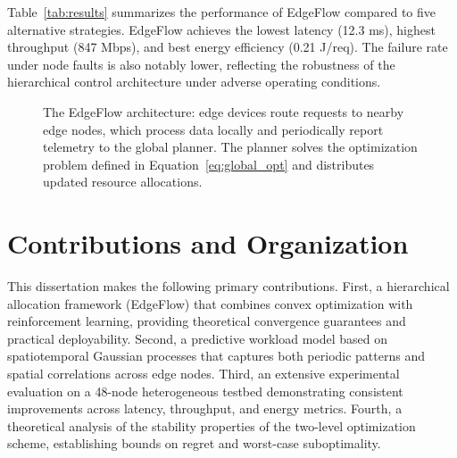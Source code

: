 \documentclass[12pt,oneside]{report}
\begin{document}
Table~\ref{tab:results} summarizes the performance of EdgeFlow compared to five alternative strategies. EdgeFlow achieves the lowest latency (12.3 ms), highest throughput (847 Mbps), and best energy efficiency (0.21 J/req). The failure rate under node faults is also notably lower, reflecting the robustness of the hierarchical control architecture under adverse operating conditions.

\begin{figure}[htbp]
\centering
{}
\caption{The EdgeFlow architecture: edge devices route requests to nearby edge nodes, which process data locally and periodically report telemetry to the global planner. The planner solves the optimization problem defined in Equation~\ref{eq:global_opt} and distributes updated resource allocations.}
\label{fig:architecture}
\end{figure}

\section{Contributions and Organization}

This dissertation makes the following primary contributions. First, a hierarchical allocation framework (EdgeFlow) that combines convex optimization with reinforcement learning, providing theoretical convergence guarantees and practical deployability. Second, a predictive workload model based on spatiotemporal Gaussian processes that captures both periodic patterns and spatial correlations across edge nodes. Third, an extensive experimental evaluation on a 48-node heterogeneous testbed demonstrating consistent improvements across latency, throughput, and energy metrics. Fourth, a theoretical analysis of the stability properties of the two-level optimization scheme, establishing bounds on regret and worst-case suboptimality.
\end{document}
